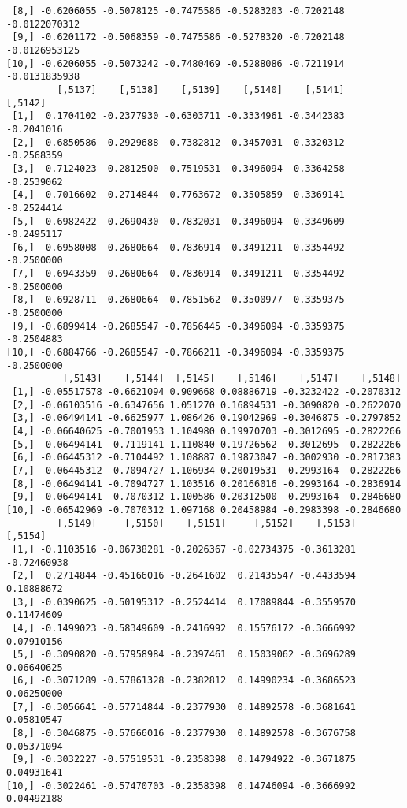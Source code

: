 \documentclass[
  letterpaper,
  DIV=11,
  numbers=noendperiod]{scrreprt}
\begin{document}
\begin{verbatim}
 [8,] -0.6206055 -0.5078125 -0.7475586 -0.5283203 -0.7202148 -0.0122070312
 [9,] -0.6201172 -0.5068359 -0.7475586 -0.5278320 -0.7202148 -0.0126953125
[10,] -0.6206055 -0.5073242 -0.7480469 -0.5288086 -0.7211914 -0.0131835938
         [,5137]    [,5138]    [,5139]    [,5140]    [,5141]    [,5142]
 [1,]  0.1704102 -0.2377930 -0.6303711 -0.3334961 -0.3442383 -0.2041016
 [2,] -0.6850586 -0.2929688 -0.7382812 -0.3457031 -0.3320312 -0.2568359
 [3,] -0.7124023 -0.2812500 -0.7519531 -0.3496094 -0.3364258 -0.2539062
 [4,] -0.7016602 -0.2714844 -0.7763672 -0.3505859 -0.3369141 -0.2524414
 [5,] -0.6982422 -0.2690430 -0.7832031 -0.3496094 -0.3349609 -0.2495117
 [6,] -0.6958008 -0.2680664 -0.7836914 -0.3491211 -0.3354492 -0.2500000
 [7,] -0.6943359 -0.2680664 -0.7836914 -0.3491211 -0.3354492 -0.2500000
 [8,] -0.6928711 -0.2680664 -0.7851562 -0.3500977 -0.3359375 -0.2500000
 [9,] -0.6899414 -0.2685547 -0.7856445 -0.3496094 -0.3359375 -0.2504883
[10,] -0.6884766 -0.2685547 -0.7866211 -0.3496094 -0.3359375 -0.2500000
          [,5143]    [,5144]  [,5145]    [,5146]    [,5147]    [,5148]
 [1,] -0.05517578 -0.6621094 0.909668 0.08886719 -0.3232422 -0.2070312
 [2,] -0.06103516 -0.6347656 1.051270 0.16894531 -0.3090820 -0.2622070
 [3,] -0.06494141 -0.6625977 1.086426 0.19042969 -0.3046875 -0.2797852
 [4,] -0.06640625 -0.7001953 1.104980 0.19970703 -0.3012695 -0.2822266
 [5,] -0.06494141 -0.7119141 1.110840 0.19726562 -0.3012695 -0.2822266
 [6,] -0.06445312 -0.7104492 1.108887 0.19873047 -0.3002930 -0.2817383
 [7,] -0.06445312 -0.7094727 1.106934 0.20019531 -0.2993164 -0.2822266
 [8,] -0.06494141 -0.7094727 1.103516 0.20166016 -0.2993164 -0.2836914
 [9,] -0.06494141 -0.7070312 1.100586 0.20312500 -0.2993164 -0.2846680
[10,] -0.06542969 -0.7070312 1.097168 0.20458984 -0.2983398 -0.2846680
         [,5149]     [,5150]    [,5151]     [,5152]    [,5153]     [,5154]
 [1,] -0.1103516 -0.06738281 -0.2026367 -0.02734375 -0.3613281 -0.72460938
 [2,]  0.2714844 -0.45166016 -0.2641602  0.21435547 -0.4433594  0.10888672
 [3,] -0.0390625 -0.50195312 -0.2524414  0.17089844 -0.3559570  0.11474609
 [4,] -0.1499023 -0.58349609 -0.2416992  0.15576172 -0.3666992  0.07910156
 [5,] -0.3090820 -0.57958984 -0.2397461  0.15039062 -0.3696289  0.06640625
 [6,] -0.3071289 -0.57861328 -0.2382812  0.14990234 -0.3686523  0.06250000
 [7,] -0.3056641 -0.57714844 -0.2377930  0.14892578 -0.3681641  0.05810547
 [8,] -0.3046875 -0.57666016 -0.2377930  0.14892578 -0.3676758  0.05371094
 [9,] -0.3032227 -0.57519531 -0.2358398  0.14794922 -0.3671875  0.04931641
[10,] -0.3022461 -0.57470703 -0.2358398  0.14746094 -0.3666992  0.04492188

\end{verbatim}
\end{document}
